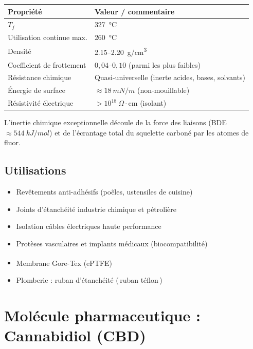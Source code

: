 ﻿\documentclass[a4paper,10pt]{article}
\newcommand{\og}{\guillemotleft\,}
\newcommand{\fg}{\,\guillemotright}
\begin{document}
\begin{center}
\begin{tabular}{ll}
  \toprule
  Propri\'{e}t\'{e} & Valeur / commentaire \\
  \midrule
  $T_f$                           & \SI{327}{\celsius} \\
  Utilisation continue max.       & \SI{260}{\celsius} \\
  Densit\'{e}                     & \SI{2.15}{}--\SI{2.20}{g/cm^3} \\
  Coefficient de frottement       & $0{,}04$--$0{,}10$ (parmi les plus faibles) \\
  R\'{e}sistance chimique         & Quasi-universelle (inerte acides, bases, solvants) \\
  \'{E}nergie de surface          & $\approx \SI{18}{mN/m}$ (non-mouillable) \\
  R\'{e}sistivit\'{e} \'{e}lectrique & $> 10^{18}\ \Omega\cdot\mathrm{cm}$ (isolant) \\
  \bottomrule
\end{tabular}
\end{center}

\medskip
L'inertie chimique exceptionnelle d\'{e}coule de la force des liaisons 
(BDE $\approx \SI{544}{kJ/mol}$) et de l'\'{e}crantage total du squelette carbon\'{e}
par les atomes de fluor.

\subsection{Utilisations}
\begin{itemize}
  \item Rev\^{e}tements anti-adh\'{e}sifs (po\^{e}les, ustensiles de cuisine)
  \item Joints d'\'{e}tanch\'{e}it\'{e} industrie chimique et p\'{e}troli\`{e}re
  \item Isolation c\^{a}bles \'{e}lectriques haute performance
  \item Prot\`{e}ses vasculaires et implants m\'{e}dicaux (biocompatibilit\'{e})
  \item Membrane Gore-Tex\textsuperscript{\textregistered} (ePTFE)
  \item Plomberie : ruban d'\'{e}tanch\'{e}it\'{e} (\og ruban t\'{e}flon\fg)
\end{itemize}

\section{Mol\'{e}cule pharmaceutique : Cannabidiol (CBD)}
\end{document}
